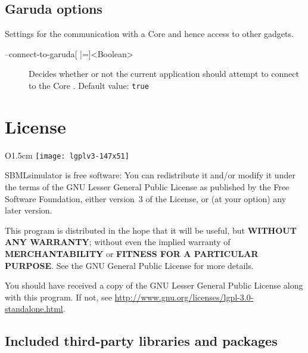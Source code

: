 \section{Garuda options}
Settings for the communication with a \Garuda Core and hence access to other \Garuda gadgets.
\begin{description}
\item[--connect-to-garuda{[} |={]}<Boolean>]
          Decides whether or not the current application should attempt
          to connect to the \Garuda Core \citep{Ghosh2011}.
          Default value: \texttt{true}
\end{description}
\renewcommand{\descriptionlabel}[1]{\textcolor{black}{\textbf{#1}}}


\chapter{License}

\begin{wrapfigure}{O}{1.5cm}
\vspace{\wrapfigspace}
\texttt{[image: lgplv3-147x51]}
\end{wrapfigure}
SBMLsimulator is free software: You can redistribute it and/or modify it under the terms of the GNU Lesser General Public License as published by the Free Software Foundation, either version~3 of the License, or (at your option) any later version.

This program is distributed in the hope that it will be useful, but \textbf{WITHOUT ANY WARRANTY}; without even the implied warranty of \textbf{MERCHANTABILITY} or \textbf{FITNESS FOR A PARTICULAR PURPOSE}. See the GNU General Public License for more details.

You should have received a copy of the GNU Lesser General Public License along with this program. If not, see \href{http://www.gnu.org/licenses/lgpl-3.0-standalone.html}{\url{http://www.gnu.org/licenses/lgpl-3.0-standalone.html}}.

\section{Included third-party libraries and packages}

